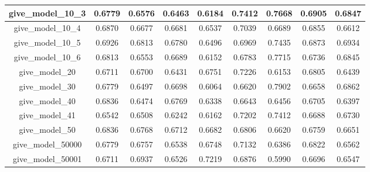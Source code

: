 \begin{table}[!h]
\begin{tabular}{|c|c|c|c|c|c|c|c|c|}
        give\_model\_10\_3                & 0.6779                        & 0.6576                         & 0.6463                      & 0.6184                  & 0.7412 & 0.7668 & 0.6905 & 0.6847 \\ \hline
        give\_model\_10\_4                & 0.6870                        & 0.6677                         & 0.6681                      & 0.6537                  & 0.7039 & 0.6689 & 0.6855 & 0.6612 \\ \hline
        give\_model\_10\_5                & 0.6926                        & 0.6813                         & 0.6780                      & 0.6496                  & 0.6969 & 0.7435 & 0.6873 & 0.6934 \\ \hline
        give\_model\_10\_6                & 0.6813                        & 0.6553                         & 0.6689                      & 0.6152                  & 0.6783 & 0.7715 & 0.6736 & 0.6845 \\ \hline
        give\_model\_20                   & 0.6711                        & 0.6700                         & 0.6431                      & 0.6751                  & 0.7226 & 0.6153 & 0.6805 & 0.6439 \\ \hline
        give\_model\_30                   & 0.6779                        & 0.6497                         & 0.6698                      & 0.6064                  & 0.6620 & 0.7902 & 0.6658 & 0.6862 \\ \hline
        give\_model\_40                   & 0.6836                        & 0.6474                         & 0.6769                      & 0.6338                  & 0.6643 & 0.6456 & 0.6705 & 0.6397 \\ \hline
        give\_model\_41                   & 0.6542                        & 0.6508                         & 0.6242                      & 0.6162                  & 0.7202 & 0.7412 & 0.6688 & 0.6730 \\ \hline
        give\_model\_50                   & 0.6836                        & 0.6768                         & 0.6712                      & 0.6682                  & 0.6806 & 0.6620 & 0.6759 & 0.6651 \\ \hline
        give\_model\_50000                & 0.6779                        & 0.6757                         & 0.6538                      & 0.6748                  & 0.7132 & 0.6386 & 0.6822 & 0.6562 \\ \hline
        give\_model\_50001                & 0.6711                        & 0.6937                         & 0.6526                      & 0.7219                  & 0.6876 & 0.5990 & 0.6696 & 0.6547 \\ \hline

\end{tabular}
\end{table}
